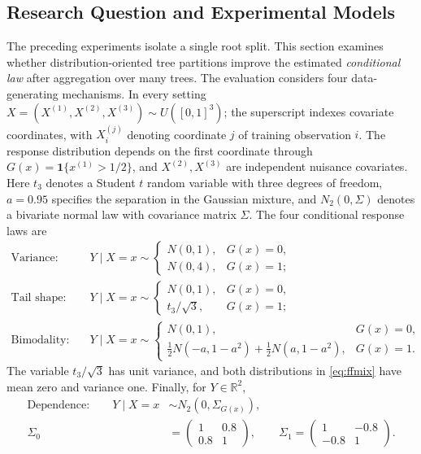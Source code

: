 \documentclass[12pt,a4paper]{article}
\newcommand{\R}{\mathbb R}
\newcommand{\1}{\mathbf 1}
\begin{document}
\subsection{Research Question and Experimental Models}
The preceding experiments isolate a single root split. This section examines whether distribution-oriented tree partitions improve the estimated \emph{conditional law} after aggregation over many trees. The evaluation considers four data-generating mechanisms. In every setting $X=(X^{(1)},X^{(2)},X^{(3)})\sim U([0,1]^3)$; the superscript indexes covariate coordinates, with $X_i^{(j)}$ denoting coordinate $j$ of training observation $i$. The response distribution depends on the first coordinate through $G(x)=\1\{x^{(1)}>1/2\}$, and $X^{(2)},X^{(3)}$ are independent nuisance covariates. Here $t_3$ denotes a Student $t$ random variable with three degrees of freedom, $a=0.95$ specifies the separation in the Gaussian mixture, and $N_2(0,\Sigma)$ denotes a bivariate normal law with covariance matrix $\Sigma$. The four conditional response laws are
\begin{align}
\text{Variance:}\quad & Y\mid X=x\sim
 \begin{cases}N(0,1),&G(x)=0,\\N(0,4),&G(x)=1;\end{cases}\label{eq:ffvariance}\\[2pt]
\text{Tail shape:}\quad & Y\mid X=x\sim
 \begin{cases}N(0,1),&G(x)=0,\\t_3/\sqrt{3},&G(x)=1;\end{cases}\label{eq:fftail}\\[2pt]
\text{Bimodality:}\quad &Y\mid X=x\sim
 \begin{cases}N(0,1),&G(x)=0,\\ \frac12N(-a,1-a^2)+\frac12N(a,1-a^2),&G(x)=1.\end{cases}\label{eq:ffmix}
\end{align}
The variable $t_3/\sqrt{3}$ has unit variance, and both distributions in \eqref{eq:ffmix} have mean zero and variance one. Finally, for $Y\in\R^2$,
\begin{equation}\label{eq:ffdep}
 \begin{aligned}
 \text{Dependence:}\qquad Y\mid X=x&\sim N_2(0,\Sigma_{G(x)}),\\
 \Sigma_0&=\begin{pmatrix}1&0.8\\0.8&1\end{pmatrix},\qquad
 \Sigma_1=\begin{pmatrix}1&-0.8\\-0.8&1\end{pmatrix}.
 \end{aligned}
\end{equation}
\end{document}
